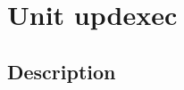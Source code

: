 \documentclass{report}
\begin{document}
\chapter{Unit updexec}
\label{updexec}
\section{Description}
\end{document}
